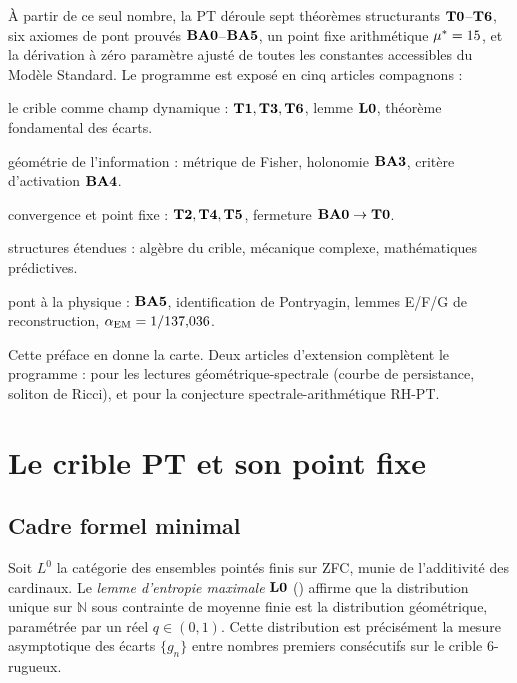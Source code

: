 À partir de ce seul nombre, la PT déroule sept théorèmes structurants $\textbf{T0}$--$\textbf{T6}$, six axiomes de pont prouvés $\textbf{BA0}$--$\textbf{BA5}$, un point fixe arithmétique $\mu^{*} = 15$, et la dérivation à zéro paramètre ajusté de toutes les constantes accessibles du Modèle Standard. Le programme est exposé en cinq articles compagnons :
\begin{description}[nosep,leftmargin=*]
\item[M1~\cite{companion_M1}] le crible comme champ dynamique : $\textbf{T1}, \textbf{T3}, \textbf{T6}$, lemme $\textbf{L0}$, théorème fondamental des écarts.
\item[M2~\cite{companion_M2}] géométrie de l'information : métrique de Fisher, holonomie $\textbf{BA3}$, critère d'activation $\textbf{BA4}$.
\item[M3~\cite{companion_M3}] convergence et point fixe : $\textbf{T2}, \textbf{T4}, \textbf{T5}$, fermeture $\textbf{BA0} \to \textbf{T0}$.
\item[M4~\cite{companion_M4}] structures étendues : algèbre du crible, mécanique complexe, mathématiques prédictives.
\item[M5~\cite{companion_M5}] pont à la physique : $\textbf{BA5}$, identification de Pontryagin, lemmes E/F/G de reconstruction, $\alpha_{\rm EM} = 1/137{,}036$.
\end{description}
Cette préface en donne la carte. Deux articles d'extension complètent le programme : \cite{PT_GeoSpectral} pour les lectures géométrique-spectrale (courbe de persistance, soliton de Ricci), et \cite{PT_RH} pour la conjecture spectrale-arithmétique RH-PT.

\section{Le crible PT et son point fixe}
\label{sec:crible}

\subsection{Cadre formel minimal}
\label{sec:crible:cadre}

Soit $L^{0}$ la catégorie des ensembles pointés finis sur ZFC, munie de l'additivité des cardinaux. Le \emph{lemme d'entropie maximale} $\textbf{L0}$ (\cite{companion_M1}) affirme que la distribution unique sur $\mathbb N$ sous contrainte de moyenne finie est la distribution géométrique, paramétrée par un réel $q \in (0, 1)$. Cette distribution est précisément la mesure asymptotique des écarts $\{g_n\}$ entre nombres premiers consécutifs sur le crible 6-rugueux.

